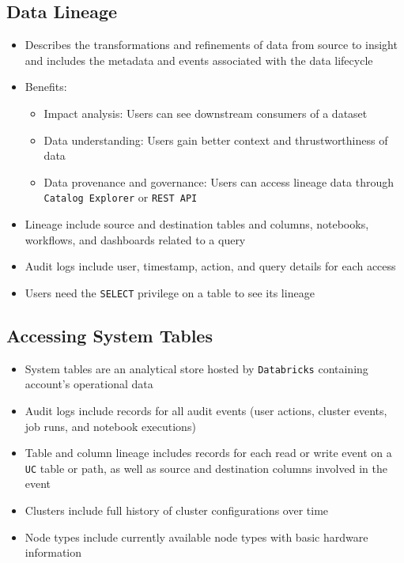 \documentclass[11pt]{scrartcl}
\begin{document}
\subsection{Data Lineage} \label{data_lineage}
\begin{itemize}
	\item Describes the transformations and refinements of data from source to insight and includes the metadata and events associated with the data lifecycle
	\item Benefits:
	\begin{itemize}
		\item Impact analysis: Users can see downstream consumers of a dataset
		\item Data understanding: Users gain better context and thrustworthiness of data
		\item Data provenance and governance: Users can access lineage data through \texttt{Catalog Explorer} or \texttt{REST API }
	\end{itemize}
	\item Lineage include source and destination tables and columns, notebooks, workflows, and dashboards related to a query
	\item Audit logs include user, timestamp, action, and query details for each access
	\item Users need the \texttt{SELECT} privilege on a table to see its lineage
\end{itemize}

\subsection{Accessing System Tables}
\begin{itemize}
	\item System tables are an analytical  store hosted by \texttt{Databricks} containing account's operational data
	\item Audit logs include records for all audit events (user actions, cluster events, job runs, and notebook executions)
	\item Table and column lineage includes records for each read or write event on a \texttt{UC} table or path, as well as source and destination columns involved in the event
	\item Clusters include full history of cluster configurations over time
	\item Node types include currently available node types with basic hardware information
\end{itemize}
\end{document}
